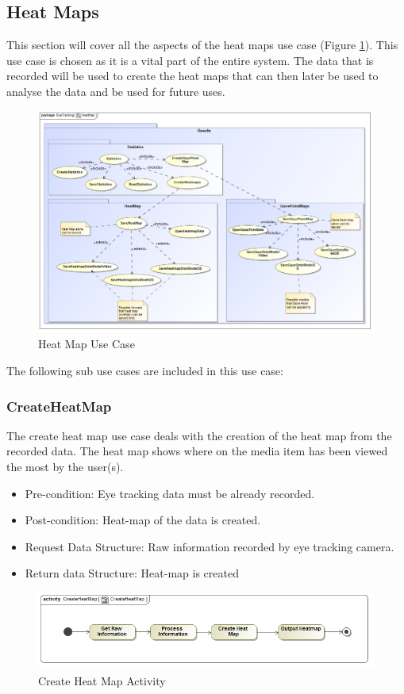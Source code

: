 \subsection{Heat Maps}
	This section will cover all the aspects of the heat maps use case (Figure \ref{HeatMapUseCase}). This use case is chosen as it is a vital part of the entire system. The data that is recorded will be used to create the heat maps that can then later be used to analyse the data and be used for future uses.
	\newline
	\begin{figure}[!ht]
		\centering
		\includegraphics[scale=0.5]{Diagrams/Use_Case_Diagram__HeatMap.png}
		\caption{Heat Map Use Case}
		\label{HeatMapUseCase}
	\end{figure}
	

	The following sub use cases are included in this use case:
	\subsubsection{CreateHeatMap}
The create heat map use case deals with the creation of the heat map from the recorded data. The heat map shows where on the media item has been viewed the most by the user(s).
	\begin{itemize}
		\item Pre-condition: Eye tracking data must be already recorded.
		\item Post-condition: Heat-map of the data is created.
		\item Request Data Structure: Raw information recorded by eye tracking camera.
		\item Return data Structure: Heat-map is created
	\end{itemize}
	\begin{figure}[!ht]
		\centering
		\includegraphics[scale=0.5]{Diagrams/Activity_Diagram__CreateHeatMap__CreateHeatMap.png}
		\caption{Create Heat Map Activity}
	\end{figure}
	
